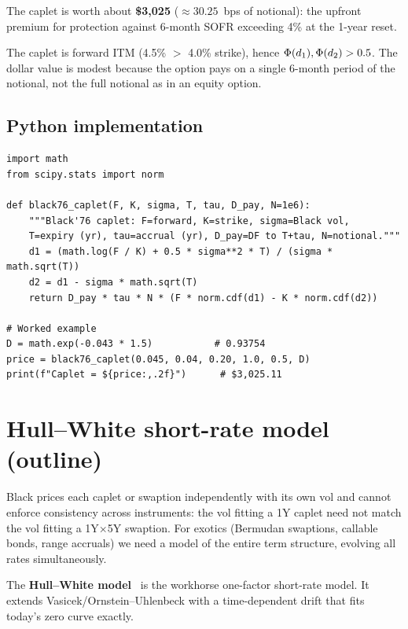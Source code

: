 The caplet is worth about \textbf{\$3{,}025} ($\approx 30.25$~bps of
notional): the upfront premium for protection against 6-month SOFR
exceeding 4\% at the 1-year reset.

\begin{intuitionbox}
The caplet is forward ITM (4.5\% $>$ 4.0\% strike), hence $\Phi(d_1),
\Phi(d_2) > 0.5$.  The dollar value is modest because the option
pays on a single 6-month period of the notional, not the full
notional as in an equity option.
\end{intuitionbox}

\subsection{Python implementation}

\begin{lstlisting}[caption={Black'76 caplet pricer},label={lst:black76_caplet}]
import math
from scipy.stats import norm

def black76_caplet(F, K, sigma, T, tau, D_pay, N=1e6):
    """Black'76 caplet: F=forward, K=strike, sigma=Black vol,
    T=expiry (yr), tau=accrual (yr), D_pay=DF to T+tau, N=notional."""
    d1 = (math.log(F / K) + 0.5 * sigma**2 * T) / (sigma * math.sqrt(T))
    d2 = d1 - sigma * math.sqrt(T)
    return D_pay * tau * N * (F * norm.cdf(d1) - K * norm.cdf(d2))

# Worked example
D = math.exp(-0.043 * 1.5)           # 0.93754
price = black76_caplet(0.045, 0.04, 0.20, 1.0, 0.5, D)
print(f"Caplet = ${price:,.2f}")      # $3,025.11
\end{lstlisting}


\section{Hull--White short-rate model (outline)}
\label{sec:hull_white}

Black prices each caplet or swaption independently with its own vol
and cannot enforce consistency across instruments: the vol fitting a
1Y caplet need not match the vol fitting a 1Y$\times$5Y swaption.
For exotics (Bermudan swaptions, callable bonds, range accruals) we
need a model of the entire term structure, evolving all rates
simultaneously.

The \textbf{Hull--White model} \citeHW\ is the workhorse one-factor
short-rate model.  It extends Vasicek/Ornstein--Uhlenbeck with a
time-dependent drift that fits today's zero curve exactly.

